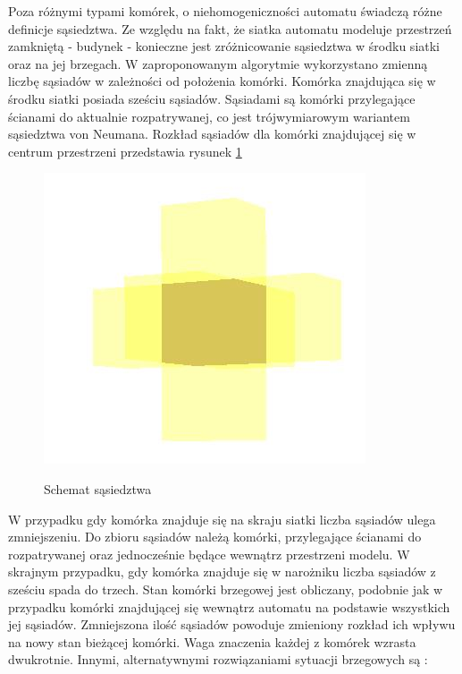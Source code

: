 Poza różnymi typami komórek, o niehomogeniczności automatu świadczą różne definicje sąsiedztwa.
Ze względu na fakt, że siatka automatu modeluje przestrzeń zamkniętą - budynek - konieczne jest zróżnicowanie sąsiedztwa w środku siatki oraz na jej brzegach.
W zaproponowanym algorytmie wykorzystano zmienną liczbę sąsiadów w zależności od położenia komórki. 
Komórka znajdująca się w środku siatki posiada sześciu sąsiadów. Sąsiadami są komórki przylegające ścianami do aktualnie
rozpatrywanej, co jest trójwymiarowym wariantem sąsiedztwa von Neumana. %
 Rozkład sąsiadów dla komórki znajdującej się w centrum przestrzeni przedstawia rysunek \ref{sasiedzi}
\begin{figure}
\begin {center}
\includegraphics{sasiedztwo.jpg} \\
\caption { Schemat sąsiedztwa}
\label {sasiedzi}
\end {center}
\end{figure}
W przypadku gdy komórka znajduje się na skraju siatki liczba sąsiadów ulega zmniejszeniu. Do zbioru sąsiadów należą komórki, przylegające ścianami do 
rozpatrywanej oraz jednocześnie będące wewnątrz przestrzeni modelu. W skrajnym przypadku, gdy komórka znajduje się w narożniku liczba sąsiadów z sześciu spada
do trzech. Stan komórki brzegowej jest obliczany, podobnie jak w przypadku komórki znajdującej się wewnątrz automatu na podstawie wszystkich jej sąsiadów. Zmniejszona ilość sąsiadów powoduje zmieniony rozkład ich wpływu na nowy stan bieżącej komórki. Waga znaczenia każdej z komórek wzrasta dwukrotnie.
Innymi, alternatywnymi rozwiązaniami sytuacji brzegowych są :
